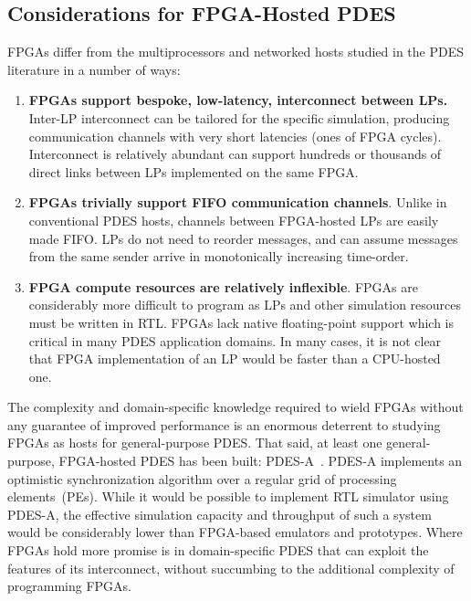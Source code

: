 

\subsection{Considerations for FPGA-Hosted PDES}

FPGAs differ from the multiprocessors and networked hosts studied in the PDES literature in a number of ways:

\begin{enumerate}
\item \textbf{FPGAs support bespoke, low-latency, interconnect between LPs.} Inter-LP
interconnect can be tailored for the specific simulation, producing
communication channels with very short latencies (ones of FPGA cycles).
Interconnect is relatively abundant can support hundreds or thousands
of direct links between LPs implemented on the same FPGA.

\item \textbf{FPGAs trivially support FIFO communication channels}. Unlike in
conventional PDES hosts, channels between FPGA-hosted LPs are easily made FIFO.
LPs do not need to reorder messages, and
can assume messages from the same sender arrive in monotonically increasing
time-order.


\item \textbf{FPGA compute resources are relatively inflexible}. FPGAs are considerably more difficult to
program as LPs and other simulation resources must be written in RTL. FPGAs lack native floating-point support which is
critical in many PDES application domains. In many cases, it is not clear that
FPGA implementation of an LP would be faster than a CPU-hosted one.
\end{enumerate}

The complexity and domain-specific knowledge required to wield FPGAs without
any guarantee of improved performance is an enormous deterrent to studying FPGAs
as hosts for general-purpose PDES. That said, at least one general-purpose, FPGA-hosted
PDES has been built: PDES-A~\cite{PDESA}. PDES-A implements an optimistic
synchronization algorithm over a regular grid of processing elements~(PEs).  While it would be
possible to implement RTL simulator using PDES-A, the effective simulation
capacity and throughput of such a system would be considerably lower than
FPGA-based emulators and prototypes. Where FPGAs hold more promise is in domain-specific PDES that
can exploit the features of its interconnect, without succumbing to the additional complexity of programming FPGAs.

